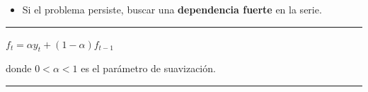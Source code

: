 \begin{f}[Corrección]
\begin{itemize}[leftmargin=*]
\begin{itemize}[leftmargin=*]
\begin{enumerate}[leftmargin=*]
\begin{center}
					\(y_{t}^{*} = \beta_{0}^{*} + \beta_{1}' x_{t}^{*} + \varepsilon_{t}\)
				\end{center}
				
				donde \(\beta_{1}' = \beta_{1}\); y estimarlo mediante MCO.
				
				\item Obtener \(\hat{u}_{t}^{*} = y_{t} - (\hat{\beta}_{0}^{*} + \hat{\beta}_{1}' x_{t}) \neq y_{t} - (\hat{\beta}_{0}^{*} + \hat{\beta}_{1}' x_{t}^{*})\).
				
				\item Repetir a partir del paso 2. El algoritmo finaliza cuando los parámetros estimados apenas varían entre iteraciones.
			\end{enumerate}
			
		\end{itemize}
		
		\item Si el problema persiste, buscar una \textbf{dependencia fuerte} en la serie.
		
	\end{itemize}
	
\end{f}

\columnbreak

\hrule

\begin{f}
	
	\begin{center}
		\(f_{t} = \alpha y_{t} + (1 - \alpha) f_{t - 1}\)
	\end{center}
	
	donde \(0 < \alpha < 1\) es el parámetro de suavización.
	
\end{f}  \hrule

